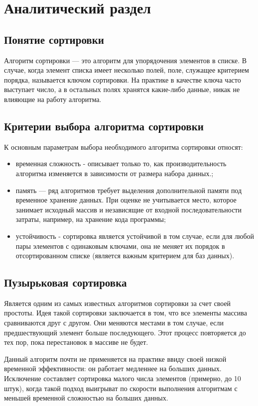 \chapter{Аналитический раздел}

\section{Понятие сортировки}
Алгоритм сортировки — это алгоритм для упорядочения элементов в списке. В случае, когда элемент списка имеет несколько полей, поле, служащее критерием порядка, называется ключом сортировки. На практике в качестве ключа часто выступает число, а в остальных полях хранятся какие-либо данные, никак не влияющие на работу алгоритма.

\section{Критерии выбора алгоритма сортировки}
К основным параметрам выбора необходимого алгоритма сортировки относят:
\begin{itemize}
	\item временная сложность - описывает только то, как производительность алгоритма изменяется в зависимости от размера набора данных.;
	\item память — ряд алгоритмов требует выделения дополнительной памяти под временное хранение данных. При оценке не учитывается место, которое занимает исходный массив и независящие от входной последовательности затраты, например, на хранение кода программы;
	\item устойчивость - сортировка является устойчивой в том случае, если для любой пары элементов с одинаковым ключами, она не меняет их порядок в отсортированном списке (является важным критерием для баз данных).
\end{itemize} 

\section{Пузырьковая сортировка}
Является одним из самых известных алгоритмов сортировки за счет своей простоты. Идея такой сортировки заключается в том, что все элементы массива сравниваются друг с другом. Они меняются местами в том случае, если предшествующий элемент больше последующего. Этот процесс повторяется до тех пор, пока перестановок в массиве не будет.

Данный алгоритм почти не применяется на практике ввиду своей низкой временной эффективности: он работает медленнее на больших данных. Исключение составляет сортировка малого числа элементов (примерно, до 10 штук), когда такой подход выигрыват по скорости выполнения алгоритмам с меньшей временной сложностью на больших данных.

